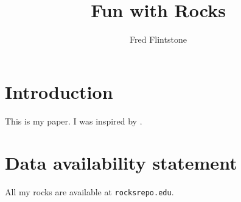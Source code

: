 \documentclass[final]{jfp-epi}
\begin{document}
\title{Fun with Rocks}

\author{Fred Flintstone}

\begin{abstract}
\lipsum[1]
\end{abstract}

\maketitle

\section{Introduction}

This is my paper. I was inspired by \citet{Rubble&Flintstone60}.

\lipsum[2-6]

\section*{Data availability statement}

All my rocks are available at \texttt{rocksrepo.edu}.



\end{document}
